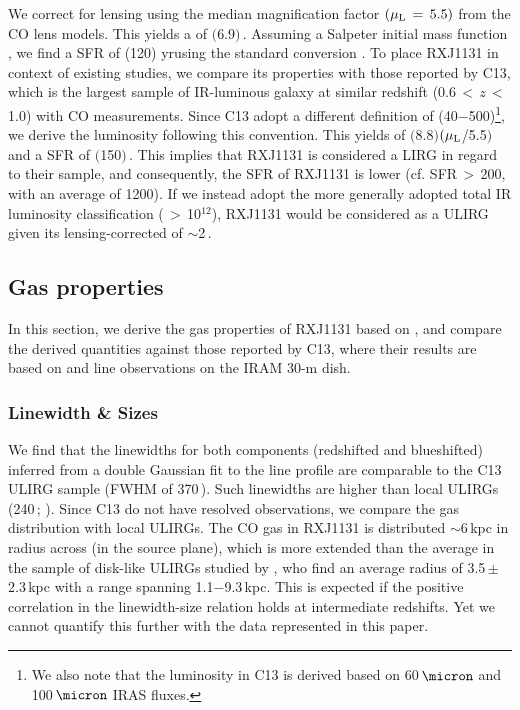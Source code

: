 \documentclass[]{emulateapj}
\begin{document}
We correct for lensing using the median magnification
factor $(\mu_{\rm L}\,=\,5.5)$
from the CO lens models. This yields a \LFIR of $($6.9$)$\,\Lsun.
Assuming a Salpeter initial
mass function \citep{Salpeter55a}, we find a
SFR of (120)\,\Msun\,yr\pmOne using the
standard conversion \citep{Kennicutt98a}.
To place RXJ1131 in context of existing studies,
we compare its properties
with those reported by C13, which is the largest sample of
IR-luminous galaxy at similar redshift
(0.6\,$<$\,$z$\,$<$\,1.0) with CO measurements.
Since C13 adopt a different definition of
\LFIR (40$-$500\micron)\footnote{We also note that the
\fir luminosity in C13 is derived
based on 60\,$\micron$ and 100\,$\micron$ IRAS fluxes.},
we derive the \fir luminosity following this convention.
This yields \LFIR of $($8.8$)$$(\mu_{\rm L}$/5.5$)$\,\Lsun and
a SFR of $($150$)$\,\sfrU.
This implies that RXJ1131 is considered a LIRG in regard to their
sample, and consequently, the SFR of RXJ1131 is lower
(cf. SFR\,$>$\,200, with an average of 1200). If we instead adopt the
more generally adopted total IR luminosity
classification (\LIR\,$>$\,10$^{12}$), RXJ1131 would be
considered as a ULIRG given its lensing-corrected
\LIR of $\sim$2\,\Lsun.

\subsection{Gas properties} \label{sec:properties}
In this section, we derive the gas properties of RXJ1131 based on \bco,
and compare the derived quantities against those reported by
C13, where their results are based on \bco and  line observations on the IRAM 30-m dish.

\subsubsection{Linewidth \& Sizes} %
We find that the linewidths for both components (redshifted and blueshifted)
inferred from a double Gaussian fit to the line profile are
comparable to the C13 ULIRG sample
(FWHM of 370\,\kms). Such linewidths are higher
than local ULIRGs (240\,\kms; \citealt[][]{Solomon97a}).
Since C13 do not have resolved observations, we compare the
gas distribution with local ULIRGs. The CO gas in RXJ1131 is
distributed $\sim$6\,kpc in radius across (in
the source plane), which is more extended than the average in the
sample of disk-like ULIRGs studied by \citet{Ueda14a},
who find an average radius of 3.5\,$\pm$\,2.3\,kpc
with a range spanning 1.1$-$9.3\,kpc.
This is expected if the positive correlation in the linewidth-size relation
holds at intermediate redshifts. Yet we cannot quantify this further
with the data represented in this paper.
\end{document}

